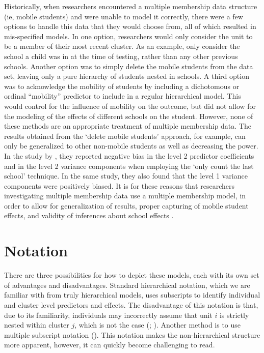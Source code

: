 \documentclass[
]{book}
\begin{document}
Historically, when researchers encountered a multiple membership data structure (ie, mobile students) and were unable to model it correctly, there were a few options to handle this data that they would choose from, all of which resulted in mis-specified models. In one option, researchers would only consider the unit to be a member of their most recent cluster. As an example, only consider the school a child was in at the time of testing, rather than any other previous schools. Another option was to simply delete the mobile students from the data set, leaving only a pure hierarchy of students nested in schools. A third option was to acknowledge the mobility of students by including a dichotomous or ordinal ``mobility'' predictor to include in a regular hierarchical model. This would control for the influence of mobility on the outcome, but did not allow for the modeling of the effects of different schools on the student. However, none of these methods are an appropriate treatment of multiple membership data. The results obtained from the `delete mobile students' approach, for example, can only be generalized to other non-mobile students as well as decreasing the power. In the study by \citet{Chung2012}, they reported negative bias in the level 2 predictor coefficients and in the level 2 variance components when employing the `only count the last school' technique. In the same study, they also found that the level 1 variance components were positively biased. It is for these reasons that researchers investigating multiple membership data use a multiple membership model, in order to allow for generalization of results, proper capturing of mobile student effects, and validity of inferences about school effects \citep{Smith2017}.

\hypertarget{notation}{%
\section{Notation}\label{notation}}

There are three possibilities for how to depict these models, each with its own set of advantages and disadvantages. Standard hierarchical notation, which we are familiar with from truly hierarchical models, uses subscripts to identify individual and cluster level predictors and effects. The disadvantage of this notation is that, due to its familiarity, individuals may incorrectly assume that unit \(\textit{i}\) is strictly nested within cluster \(\textit{j}\), which is not the case (\citet{SnijdersICC}; \citet{Leckie2013}). Another method is to use multiple subscript notation (\citet{Beretvas}). This notation makes the non-hierarchical structure more apparent, however, it can quickly become challenging to read.
\end{document}
